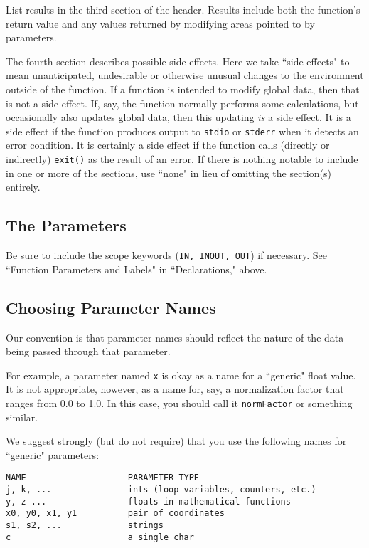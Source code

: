 List results in the third section of the header.  Results include both
the function's return value and any values returned by modifying areas
pointed to by parameters.

The fourth section describes possible side effects.  Here we take
``side effects" to mean unanticipated, undesirable or otherwise
unusual changes to the environment outside of the function.  If a
function is intended to modify global data, then that is not a side
effect.  If, say, the function normally performs some calculations,
but occasionally also updates global data, then this updating {\em is}
a side effect.  It is a side effect if the function produces output to
{\tt stdio} or {\tt stderr} when it detects an error condition.  It is
certainly a side effect if the function calls (directly or indirectly)
{\tt exit()} as the result of an error.  If there is nothing notable
to include in one or more of the sections, use ``none" in lieu of
omitting the section(s) entirely.

\subsection{The Parameters}

Be sure to include the scope keywords ({\tt IN, INOUT, OUT}) if
necessary.  See ``Function Parameters and Labels" in ``Declarations,"
above.

\subsection{Choosing Parameter Names}
Our convention is that parameter names should reflect the nature of
the data being passed through that parameter.

For example, a parameter named {\tt x} is okay as a name for a
``generic" float value.  It is not appropriate, however, as a name
for, say, a normalization factor that ranges from 0.0 to 1.0.  In this
case, you should call it {\tt normFactor} or something similar.

We suggest strongly (but do not require) that you use the following
names for ``generic" parameters:

\begin{verbatim}
NAME                    PARAMETER TYPE
j, k, ...               ints (loop variables, counters, etc.)
y, z ...                floats in mathematical functions
x0, y0, x1, y1          pair of coordinates
s1, s2, ...             strings
c                       a single char
\end{verbatim}

